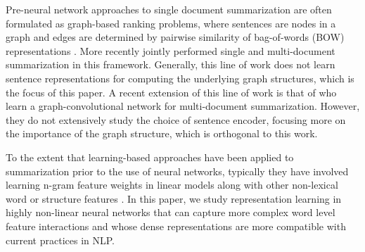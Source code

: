 
Pre-neural network
approaches to single document summarization
are often formulated as graph-based ranking problems, where
sentences are nodes in a graph and edges are determined by pairwise 
similarity of bag-of-words (BOW) representations 
\citep{erkan2004lexrank}.  %
More recently \citet{wan2010towards}
jointly performed single and multi-document summarization in this framework. 
Generally, this line of work does not learn sentence representations for 
computing the underlying graph structures, which is the focus of this paper.
%
A recent extension of this line of work is that of \citet{yasunaga2017graph}
who
learn a graph-convolutional network for
multi-document summarization. However, they do not extensively  study the 
choice of sentence encoder, focusing more on the importance of the 
graph structure, which is orthogonal to this work.

To the extent that learning-based approaches have been applied
to summarization prior to the use of neural networks, typically they have involved learning n-gram feature weights 
in linear models along with other non-lexical word or 
structure features 
\cite{berg2011jointly,sipos2012large,durrett2016learning}.
In this paper, we study representation learning in highly non-linear
neural networks that can capture more complex word level feature interactions
and whose dense representations are more compatible with current practices
in NLP.


